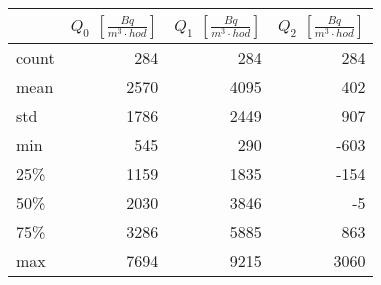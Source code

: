 \begin{tabular}{lrrr}
\toprule
{} &  $Q_0$ $\left[\si{\frac{Bq}{m^3\cdot hod}}\right]$ &  $Q_1$ $\left[\si{\frac{Bq}{m^3\cdot hod}}\right]$ &  $Q_2$ $\left[\si{\frac{Bq}{m^3\cdot hod}}\right]$ \\
\midrule
count &                                                284 &                                                284 &                                                284 \\
mean  &                                               2570 &                                               4095 &                                                402 \\
std   &                                               1786 &                                               2449 &                                                907 \\
min   &                                                545 &                                                290 &                                               -603 \\
25\%   &                                               1159 &                                               1835 &                                               -154 \\
50\%   &                                               2030 &                                               3846 &                                                 -5 \\
75\%   &                                               3286 &                                               5885 &                                                863 \\
max   &                                               7694 &                                               9215 &                                               3060 \\
\bottomrule
\end{tabular}
